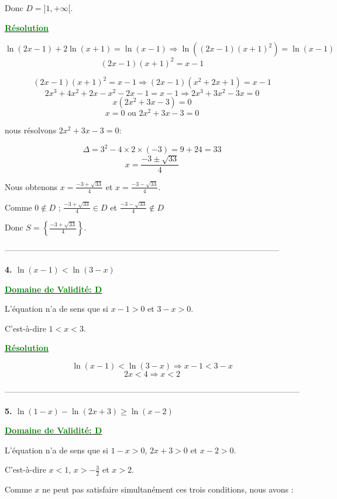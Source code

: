 \documentclass[12pt]{article}
\begin{document}
Donc \(D = ]1, +\infty[\).

\textbf{\underline{\textcolor{green}{Résolution}}}

\[
\ln(2x-1)+2\ln(x+1)=\ln(x-1)\Longrightarrow \ln((2x-1)(x+1)^2)=\ln(x-1)
\]
\[
(2x-1)(x+1)^2=x-1
\]

\[
(2x-1)(x+1)^2=x-1 \Longrightarrow (2x-1)(x^2 + 2x + 1)=x-1
\]
\[
2x^3 + 4x^2 + 2x - x^2 - 2x - 1 = x - 1 \Longrightarrow 2x^3 + 3x^2 - 3x = 0
\]
\[
x(2x^2 + 3x - 3) = 0
\]
\[
x=0 \text{ ou } 2x^2 + 3x - 3 = 0
\]

nous résolvons \(2x^2 + 3x - 3 = 0\):

\[
\Delta = 3^2 - 4 \times 2 \times (-3) = 9 + 24 = 33
\]
\[
x = \frac{-3 \pm \sqrt{33}}{4}
\]

Nous obtenons \(x = \frac{-3 + \sqrt{33}}{4}\) et \(x = \frac{-3 - \sqrt{33}}{4}\).

Comme \(0 \notin D\) ; \(\frac{-3 + \sqrt{33}}{4} \in D\) et \(\frac{-3 - \sqrt{33}}{4} \notin D\)  

Donc \(S = \left\{\frac{-3 + \sqrt{33}}{4}\right\}\).

\textcolor{green}{}

-----------------------------------------------------------------------------------------------------

\textbf{4. \(\ln(x-1)<\ln(3-x)\)}

\textbf{\underline{\textcolor{green}{Domaine de Validité: D}}}

L'équation n'a de sens que si \(x-1>0\) et \(3-x>0\).

C'est-à-dire \(1<x<3\).

\textbf{\underline{\textcolor{green}{Résolution}}}

\[
\ln(x-1)<\ln(3-x)\Longrightarrow x-1<3-x
\]
\[
2x<4\Longrightarrow x<2
\]

\textcolor{green}{\boxed{S=]1,2[}}

------------------------------------------------------------------------------------------------------------

\textbf{5. \(\ln(1-x)-\ln(2x+3)\geq\ln(x-2)\)}

\textbf{\underline{\textcolor{green}{Domaine de Validité: D}}}

L'équation n'a de sens que si \(1-x>0\), \(2x+3>0\) et \(x-2>0\).

C'est-à-dire \(x<1\), \(x>-\frac{3}{2}\) et \(x>2\).

Comme \(x\) ne peut pas satisfaire simultanément ces trois conditions, nous avons :
\end{document}
